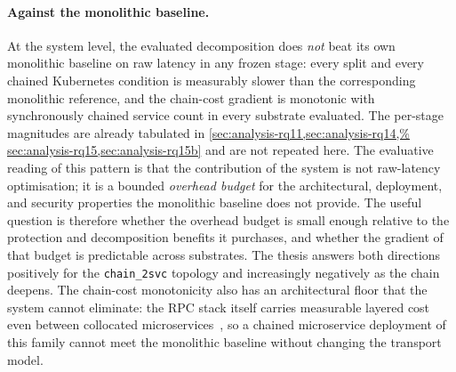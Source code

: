 \paragraph{Against the monolithic baseline.}
At the system level, the evaluated decomposition does \emph{not}
beat its own monolithic baseline on raw latency in any frozen stage:
every split and every chained Kubernetes condition is measurably
slower than the corresponding monolithic reference, and the
chain-cost gradient is monotonic with synchronously chained service
count in every substrate evaluated. The per-stage magnitudes are
already tabulated in \cref{sec:analysis-rq11,sec:analysis-rq14,%
sec:analysis-rq15,sec:analysis-rq15b} and are not repeated here. The
evaluative reading of this pattern is that the contribution of the
system is not raw-latency optimisation; it is a bounded
\emph{overhead budget} for the architectural, deployment, and
security properties the monolithic baseline does not provide. The
useful question is therefore whether the overhead budget is small
enough relative to the protection and decomposition benefits it
purchases, and whether the gradient of that budget is predictable
across substrates. The thesis answers both directions positively for
the \texttt{chain\_2svc} topology and increasingly negatively as the
chain deepens. The chain-cost monotonicity also has an architectural
floor that the system cannot eliminate: the RPC stack itself carries
measurable layered cost even between collocated
microservices~\cite{rpc_overhead_hotos25,notnets_apsys24}, so a
chained microservice deployment of this family cannot meet the
monolithic baseline without changing the transport model.

